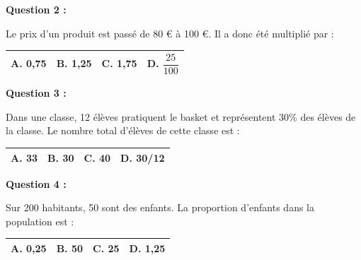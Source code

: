 \documentclass[12pt,a4paper]{article}
\begin{document}
\vspace{0.7cm}

\textbf{Question 2 :} 
\vspace{5pt}

Le prix d'un produit est passé de 80 € à 100 €.  
Il a donc été multiplié par : 
\vspace{0.3cm}

\renewcommand{\arraystretch}{3} 
\begin{tabular}{|m{3.4cm}|m{3.4cm}|m{3.4cm}|m{3.4cm}|}
\hline
\centering \vspace{-0.3cm} \textbf{A.} 0,75 & 
\centering \vspace{-0.3cm} \textbf{B.} 1,25 & 
\centering \vspace{-0.3cm} \textbf{C.} 1,75 & 
\centering \vspace{-0.3cm} \textbf{D.} $\dfrac{25}{100}$ \tabularnewline
\hline
\end{tabular}

\vspace{0.7cm}

\textbf{Question 3 :} 
\vspace{5pt}

Dans une classe, 12 élèves pratiquent le basket et représentent 30\% des élèves de la classe.  
Le nombre total d'élèves de cette classe est : 
\vspace{0.3cm}

\renewcommand{\arraystretch}{3} 
\begin{tabular}{|m{3.4cm}|m{3.4cm}|m{3.4cm}|m{3.4cm}|}
\hline
\centering \vspace{-0.3cm} \textbf{A.} 33 & 
\centering \vspace{-0.3cm} \textbf{B.} 30 & 
\centering \vspace{-0.3cm} \textbf{C.} 40 & 
\centering \vspace{-0.3cm} \textbf{D.} 30/12 \tabularnewline
\hline
\end{tabular}

\vspace{0.7cm}

\textbf{Question 4 :} 
\vspace{5pt}

Sur 200 habitants, 50 sont des enfants.  
La proportion d'enfants dans la population est : 
\vspace{0.3cm}

\renewcommand{\arraystretch}{3} 
\begin{tabular}{|m{3.4cm}|m{3.4cm}|m{3.4cm}|m{3.4cm}|}
\hline
\centering \vspace{-0.3cm} \textbf{A.} 0,25 & 
\centering \vspace{-0.3cm} \textbf{B.} 50 & 
\centering \vspace{-0.3cm} \textbf{C.} 25 & 
\centering \vspace{-0.3cm} \textbf{D.} 1,25 \tabularnewline
\hline
\end{tabular}
\end{document}
